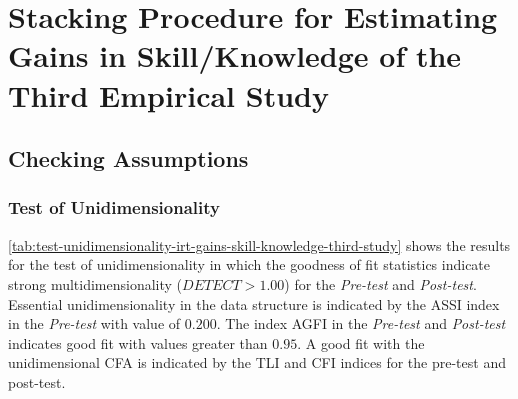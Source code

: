 \section{Stacking Procedure for Estimating Gains in Skill/Knowledge of the Third Empirical Study}
\label{sec:irt-learning-outcomes-third-study}


\subsection{Checking Assumptions}

\subsubsection*{Test of Unidimensionality}

\autoref{tab:test-unidimensionality-irt-gains-skill-knowledge-third-study} shows the results for the test of unidimensionality in which the goodness of fit statistics indicate strong multidimensionality ($DETECT > 1.00$) for the \emph{Pre-test} and \emph{Post-test}. 
Essential unidimensionality in the data structure is indicated by the ASSI index in the \emph{Pre-test} with value of $0.200$.
The index AGFI in the \emph{Pre-test} and \emph{Post-test} indicates good fit with values greater than $0.95$.
A good fit with the unidimensional CFA is indicated by the TLI and CFI indices for the pre-test and post-test.


